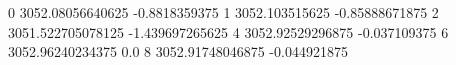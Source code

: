 0 3052.08056640625 -0.8818359375
1 3052.103515625 -0.85888671875
2 3051.522705078125 -1.439697265625
4 3052.92529296875 -0.037109375
6 3052.96240234375 0.0
8 3052.91748046875 -0.044921875
